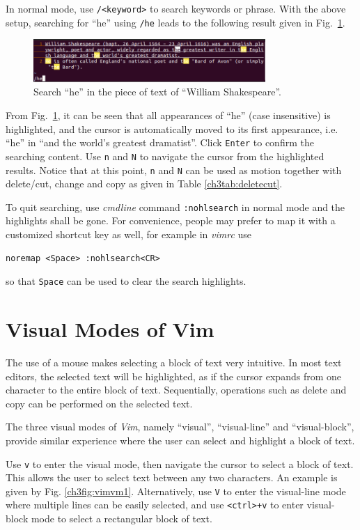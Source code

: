 In normal mode, use \verb|/<keyword>| to search keywords or phrase. With the above setup, searching for ``he'' using \verb|/he| leads to the following result given in Fig.~\ref{ch3fig:vimdemo2}.
\begin{figure}
\centering
\includegraphics[width=250pt]{chapters/chapter3/figures/vimdemo2.png}
\caption{Search ``he'' in the piece of text of ``William Shakespeare''.} \label{ch3fig:vimdemo2}
\end{figure}
From Fig.~\ref{ch3fig:vimdemo2}, it can be seen that all appearances of ``he'' (case insensitive) is highlighted, and the cursor is automatically moved to its first appearance, i.e. ``he'' in ``and the world's greatest dramatist''. Click \verb|Enter| to confirm the searching content. Use \verb|n| and \verb|N| to navigate the cursor from the highlighted results. Notice that at this point, \verb|n| and \verb|N| can be used as motion together with delete/cut, change and copy as given in Table \ref{ch3tab:deletecut}.

To quit searching, use \textit{cmdline} command \verb|:nohlsearch| in normal mode and the highlights shall be gone. For convenience, people may prefer to map it with a customized shortcut key as well, for example in \textit{vimrc} use
\begin{verbatim}
noremap <Space> :nohlsearch<CR>
\end{verbatim}
so that \verb|Space| can be used to clear the search highlights.

\section{Visual Modes of Vim}

The use of a mouse makes selecting a block of text very intuitive. In most text editors, the selected text will be highlighted, as if the cursor expands from one character to the entire block of text. Sequentially, operations such as delete and copy can be performed on the selected text.

The three visual modes of \textit{Vim}, namely ``visual'', ``visual-line'' and ``visual-block'', provide similar experience where the user can select and highlight a block of text.

Use \verb|v| to enter the visual mode, then navigate the cursor to select a block of text. This allows the user to select text between any two characters. An example is given by Fig. \ref{ch3fig:vimvm1}. Alternatively, use \verb|V| to enter the visual-line mode where multiple lines can be easily selected, and use \verb|<ctrl>+v| to enter visual-block mode to select a rectangular block of text.

